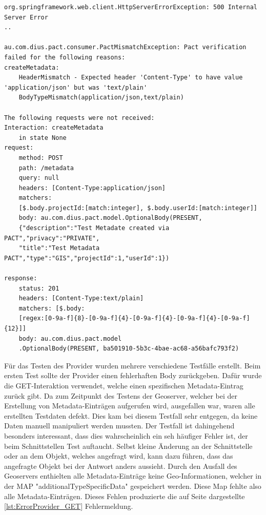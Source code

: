 \documentclass{llncs}
\begin{document}
\begin{lstlisting}[caption=Fehler im Header,label={lst:ErrorHeaderConsumer}]
org.springframework.web.client.HttpServerErrorException: 500 Internal Server Error
..

au.com.dius.pact.consumer.PactMismatchException: Pact verification failed for the following reasons:
createMetadata:
    HeaderMismatch - Expected header 'Content-Type' to have value 'application/json' but was 'text/plain'
    BodyTypeMismatch(application/json,text/plain)

The following requests were not received:
Interaction: createMetadata
	in state None
request:
	method: POST
	path: /metadata
	query: null
	headers: [Content-Type:application/json]
	matchers: 
	[$.body.projectId:[match:integer], $.body.userId:[match:integer]]
	body: au.com.dius.pact.model.OptionalBody(PRESENT, 
	{"description":"Test Metadate created via PACT","privacy":"PRIVATE",
	"title":"Test Metadata PACT","type":"GIS","projectId":1,"userId":1})

response:
	status: 201 
	headers: [Content-Type:text/plain] 
	matchers: [$.body:
	[regex:[0-9a-f]{8}-[0-9a-f]{4}-[0-9a-f]{4}-[0-9a-f]{4}-[0-9a-f]{12}]] 
	body: au.com.dius.pact.model
	.OptionalBody(PRESENT, ba501910-5b3c-4bae-ac68-a56bafc793f2)
\end{lstlisting}

Für das Testen des Provider wurden mehrere verschiedene Testfälle erstellt. Beim ersten Test sollte der Provider einen fehlerhaften Body zurückgeben. Dafür wurde die GET-Interaktion verwendet, welche einen spezifischen Metadata-Eintrag zurück gibt. Da zum Zeitpunkt des Testens der Geoserver, welcher bei der Erstellung von Metadata-Einträgen aufgerufen wird,  ausgefallen war, waren alle erstellten Testdaten defekt. Dies kam bei diesem Testfall sehr entgegen, da keine Daten manuell manipuliert werden mussten. Der Testfall ist dahingehend besonders interessant, dass dies wahrscheinlich ein seh häufiger Fehler ist, der beim Schnittstellen Test auftaucht. Selbst kleine Änderung an der Schnittstelle oder an dem Objekt, welches angefragt wird, kann dazu führen, dass das angefragte Objekt bei der Antwort anders aussieht. 
Durch den Ausfall des Geoservers enthielten alle Metadata-Einträge keine Geo-Informationen, welcher in der MAP "additionalTypeSpecificData" gespeichert werden. Diese Map fehlte also alle Metadata-Einträgen. Dieses Fehlen produzierte die auf Seite \pageref{lst:ErrorProvider_GET} dargestellte \ref{lst:ErrorProvider_GET} Fehlermeldung.
\end{document}
